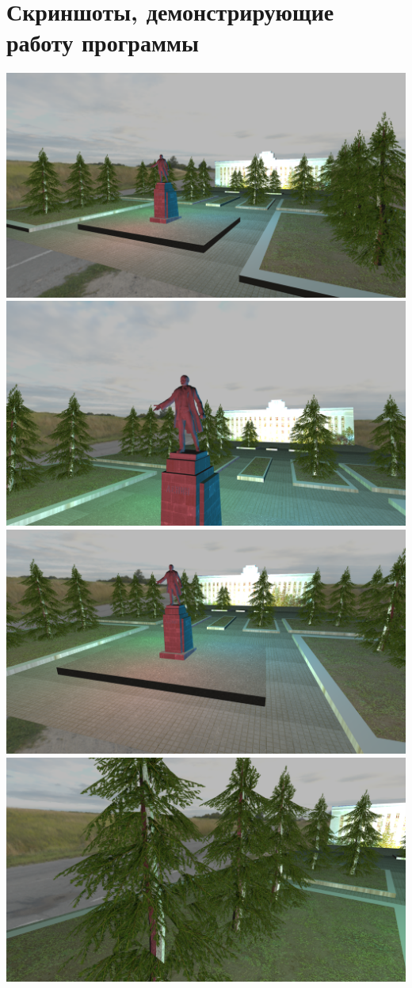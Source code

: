 \documentclass[a4paper,12pt]{article}
\begin{document}
\section{\normalsize{Скриншоты, демонстрирующие работу программы}}
\begin{flushleft}
  \includegraphics[scale=0.2]{screen_1.png}
  \includegraphics[scale=0.2]{screen_2.png}
  \includegraphics[scale=0.2]{screen_3.png}
  \includegraphics[scale=0.2]{screen_4.png}

\end{flushleft}
\end{document}
